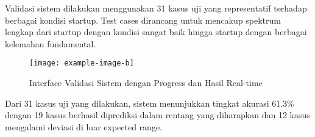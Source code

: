 \documentclass[12pt,a4paper]{article}
\begin{document}
Validasi sistem dilakukan menggunakan 31 kasus uji yang representatif terhadap berbagai kondisi startup. Test cases dirancang untuk mencakup spektrum lengkap dari startup dengan kondisi sangat baik hingga startup dengan berbagai kelemahan fundamental.

\begin{figure}[htbp] %
    \centering
    \texttt{[image: example-image-b]} %
    \caption{Interface Validasi Sistem dengan Progress dan Hasil Real-time}
    \label{fig:validation-ui}
\end{figure}

Dari 31 kasus uji yang dilakukan, sistem menunjukkan tingkat akurasi 61.3\% dengan 19 kasus berhasil diprediksi dalam rentang yang diharapkan dan 12 kasus mengalami deviasi di luar expected range.
\end{document}
